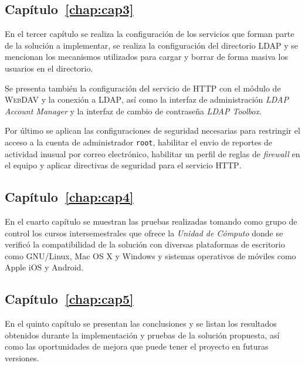 \newpage
    \subsection*{Cap\'{i}tulo~\ref{chap:cap3}}

En el tercer cap\'{i}tulo se realiza la configuraci\'{o}n de los servicios que forman parte de la soluci\'{o}n a implementar, se realiza la configuraci\'{o}n del directorio \textsc{LDAP} y se mencionan los mecanismos utilizados para cargar y borrar de forma masiva los usuarios en el directorio.

Se presenta tambi\'{e}n la configuraci\'{o}n del servicio de \textsc{HTTP} con el m\'{o}dulo de \textsc{WebDAV} y la conexi\'{o}n a \textsc{LDAP}, as\'{i} como la interfaz de administraci\'{o}n \textit{LDAP Account Manager} y la interfaz de cambio de contrase\~{n}a \textit{LDAP Toolbox}.

Por \'{u}ltimo se aplican las configuraciones de seguridad necesarias para restringir el acceso a la cuenta de administrador \texttt{root}, habilitar el envio de reportes de actividad inusual por correo electr\'{o}nico, habilitar un perfil de reglas de \textit{firewall} en el equipo y aplicar directivas de seguridad para el servicio \textsc{HTTP}.

    \subsection*{Cap\'{i}tulo~\ref{chap:cap4}}

En el cuarto cap\'{i}tulo se muestran las pruebas realizadas tomando como grupo de control los cursos intersemestrales que ofrece la \textsl{Unidad de C\'{o}mputo} donde se verific\'{o} la compatibilidad de la soluci\'{o}n con diversas plataformas de escritorio como GNU/Linux, Mac OS X y Windows y sistemas operativos de m\'{o}viles como Apple iOS y Android.

    \subsection*{Cap\'{i}tulo~\ref{chap:cap5}}

En el quinto cap\'{i}tulo se presentan las conclusiones y se listan los resultados obtenidos durante la implementaci\'{o}n y pruebas de la soluci\'{o}n propuesta, as\'{i} como las oportunidades de mejora que puede tener el proyecto en futuras versiones.

